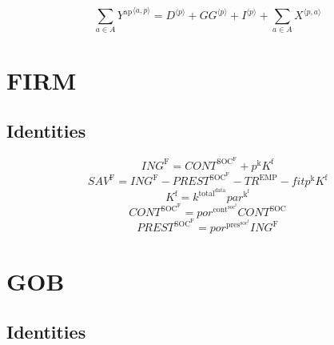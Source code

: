 \begin{equation}
\sum_{a\in A} {Y^{\mathrm{ap}}}^{\langle a,p\rangle} = {D}^{\langle p\rangle} + {{G\!G}}^{\langle p\rangle} + {I}^{\langle p\rangle} + \sum_{a\in A} {X}^{\langle p,a\rangle}
\end{equation}




\section{FIRM}

\subsection{Identities}

\begin{equation}
{I\!N\!G}^{\mathrm{F}} = {C\!O\!N\!T}^{\mathrm{SOC}^{\mathrm{F}}} + {p^{\mathrm{k}}} {K^{\mathrm{f}}}
\end{equation}
\begin{equation}
{S\!A\!V}^{\mathrm{F}} = {I\!N\!G}^{\mathrm{F}} - {P\!R\!E\!S\!T}^{\mathrm{SOC}^{\mathrm{F}}} - {T\!R}^{\mathrm{EMP}} - {{f\!i\!t}} {p^{\mathrm{k}}} {K^{\mathrm{f}}}
\end{equation}
\begin{equation}
K^{\mathrm{f}} = {k^{\mathrm{total}^{\mathrm{data}}}} {{p\!a\!r}^{\mathrm{k}^{\mathrm{f}}}}
\end{equation}
\begin{equation}
{C\!O\!N\!T}^{\mathrm{SOC}^{\mathrm{F}}} = {{p\!o\!r}^{\mathrm{cont}^{\mathrm{soc}^{\mathrm{f}}}}} {{C\!O\!N\!T}^{\mathrm{SOC}}}
\end{equation}
\begin{equation}
{P\!R\!E\!S\!T}^{\mathrm{SOC}^{\mathrm{F}}} = {{p\!o\!r}^{\mathrm{pres}^{\mathrm{soc}^{\mathrm{f}}}}} {{I\!N\!G}^{\mathrm{F}}}
\end{equation}




\section{GOB}

\subsection{Identities}

